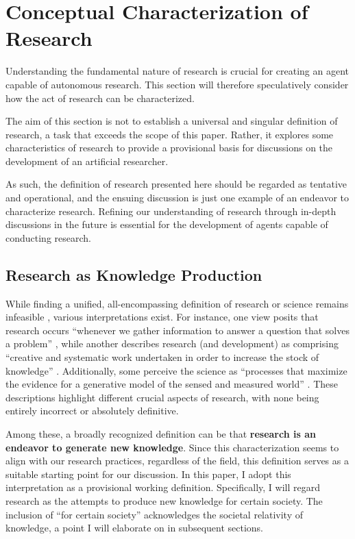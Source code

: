 \section{Conceptual Characterization of Research}
\label{section-what-is-research}

Understanding the fundamental nature of research is crucial for creating an agent capable of autonomous research. This section will therefore speculatively consider how the act of research can be characterized.

The aim of this section is not to establish a universal and singular definition of research, a task that exceeds the scope of this paper. Rather, it explores some characteristics of research to provide a provisional basis for discussions on the development of an artificial researcher. 

As such, the definition of research presented here should be regarded as tentative and operational, and the ensuing discussion is just one example of an endeavor to characterize research. Refining our understanding of research through in-depth discussions in the future is essential for the development of agents capable of conducting research. 

\subsection{Research as Knowledge Production}

While finding a unified, all-encompassing definition of research or science remains infeasible \cite{chalmers2013thing,sep-scientific-method}, various interpretations exist. For instance, one view posits that research occurs ``whenever we gather information to answer a question that solves a problem'' \cite{booth2003craft}, while another describes research (and development) as comprising ``creative and systematic work undertaken in order to increase the stock of knowledge'' \cite{manual2015guidelines}. Additionally, some perceive the science as ``processes that maximize the evidence for a generative model of the sensed and measured world'' \cite{balzandistributed}. These descriptions highlight different crucial aspects of research, with none being entirely incorrect or absolutely definitive.

Among these, a broadly recognized definition can be that \textbf{research is an endeavor to generate new knowledge}. Since this characterization seems to align with our research practices, regardless of the field, this definition serves as a suitable starting point for our discussion. In this paper, I adopt this interpretation as a provisional working definition. Specifically, I will regard research as the attempts to produce new knowledge for certain society. The inclusion of ``for certain society'' acknowledges the societal relativity of knowledge, a point I will elaborate on in subsequent sections.


